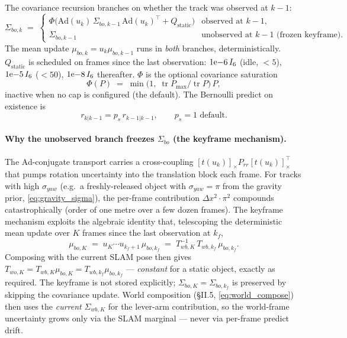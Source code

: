 \documentclass[11pt]{article}
\DeclareMathOperator{\Tr}{tr}
\newcommand{\Ad}{\mathrm{Ad}}
\begin{document}
The covariance recursion branches on whether the track was observed at
$k{-}1$:
\begin{equation}\label{eq:proc}
\Sigma_{bo,k} \;=\;
\begin{cases}
\Phi\!\bigl(\Ad(u_k)\,\Sigma_{bo,k-1}\,\Ad(u_k)^\top + Q_{\text{static}}\bigr) & \text{observed at } k{-}1, \\[2pt]
\Sigma_{bo,k-1} & \text{unobserved at } k{-}1 \text{ (frozen keyframe)}.
\end{cases}
\end{equation}
The mean update $\mu_{bo,k}=u_k\mu_{bo,k-1}$ runs in \emph{both} branches,
deterministically. $Q_{\text{static}}$ is scheduled on frames since the
last observation: $1{\rm e}{-}6\,I_6$ (idle, $<5$),
$1{\rm e}{-}5\,I_6$ ($<50$), $1{\rm e}{-}8\,I_6$ thereafter.
$\Phi$ is the optional covariance saturation
\begin{equation}\label{eq:phi}
\Phi(P) \;=\; \min\!\bigl(1,\;\Tr P_{\max}/\Tr P\bigr)\,P,
\end{equation}
inactive when no cap is configured (the default). The Bernoulli predict on
existence is
\begin{equation}\label{eq:bern_pred_r}
r_{k|k-1} = p_s\,r_{k-1|k-1}, \qquad p_s = 1 \text{ default}.
\end{equation}

\paragraph{Why the unobserved branch freezes $\Sigma_{bo}$ (the keyframe
mechanism).}
The Ad-conjugate transport carries a cross-coupling
$[t(u_k)]_\times P_{rr}[t(u_k)]_\times^\top$ that pumps rotation
uncertainty into the translation block each frame. For tracks with high
$\sigma_{yaw}$ (e.g.\ a freshly-released object with $\sigma_{yaw}=\pi$
from the gravity prior, \eqref{eq:gravity_sigma}), the per-frame
contribution $\Delta x^2\!\cdot\!\pi^2$ compounds catastrophically (order
of one metre over a few dozen frames). The keyframe mechanism exploits the
algebraic identity that, telescoping the deterministic mean update over
$K$ frames since the last observation at $k_f$,
\begin{equation}\label{eq:telescope}
\mu_{bo,K} \;=\; u_K \cdots u_{k_f+1}\,\mu_{bo,k_f}
            \;=\; T_{wb,K}^{-1}\,T_{wb,k_f}\,\mu_{bo,k_f}.
\end{equation}
Composing with the current SLAM pose then gives
$T_{wo,K}=T_{wb,K}\mu_{bo,K}=T_{wb,k_f}\mu_{bo,k_f}$ --- \emph{constant} for
a static object, exactly as required. The keyframe is not stored
explicitly; $\Sigma_{bo,K}=\Sigma_{bo,k_f}$ is preserved by skipping the
covariance update. World composition (\S II.5, \eqref{eq:world_compose})
then uses the \emph{current} $\Sigma_{wb,K}$ for the lever-arm
contribution, so the world-frame uncertainty grows only via the SLAM
marginal --- never via per-frame predict drift.
\end{document}
